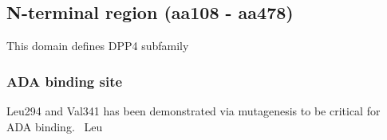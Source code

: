 \subsection{N-terminal region (aa108 - aa478)}

This domain defines DPP4 subfamily

\subsubsection{ADA binding site}
Leu294 and Val341 has been demonstrated via mutagenesis to be critical for ADA binding.~\cite{Abbott_1999} Leu 